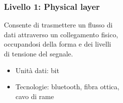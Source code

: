 \documentclass[aspectratio=169]{beamer}
\begin{document}
    \begin{frame}
        \frametitle{Livello 1: Physical layer}
        Consente di trasmettere un flusso di\\dati attraverso un collegamento fisico,\\occupandosi della forma e dei livelli\\di tensione del segnale.
        \begin{itemize}
            \item Unità dati: bit
            \item Tecnologie: bluetooth, fibra ottica,\\cavo di rame
        \end{itemize}
    \end{frame}
    
\end{document}
